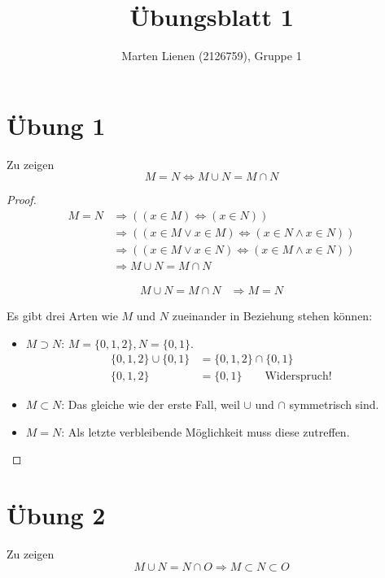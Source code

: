 \documentclass[a4paper,10pt]{article}
\title{Übungsblatt 1}
\author{Marten Lienen (2126759), Gruppe 1}
\begin{document}
\maketitle

\section*{Übung 1}

Zu zeigen
\begin{equation}
 M = N \Leftrightarrow M \cup N = M \cap N
\end{equation}

\begin{proof}
 \begin{align}
  M = N & \Rightarrow ((x \in M) \Leftrightarrow (x \in N))\\
  & \Rightarrow ((x \in M \lor x \in M) \Leftrightarrow (x \in N \land x \in N))\\
  & \Rightarrow ((x \in M \lor x \in N) \Leftrightarrow (x \in M \land x \in N))\\
  & \Rightarrow M \cup N = M \cap N
 \end{align}
 
 \begin{align}
  M \cup N = M \cap N & \Rightarrow M = N
 \end{align}
 
 Es gibt drei Arten wie $M$ und $N$ zueinander in Beziehung stehen können:
 \begin{itemize}
  \item $M \supset N$: $M = \{0, 1, 2\}, N = \{0, 1\}$.
   \begin{align}
    \{0, 1, 2\} \cup \{0, 1\} & = \{0, 1, 2\} \cap \{0, 1\}\\
    \{0, 1, 2\} & = \{0, 1\} \qquad \text{Widerspruch!}
   \end{align}
  \item $M \subset N$: Das gleiche wie der erste Fall, weil $\cup$ und $\cap$ symmetrisch sind.
  \item $M = N$: Als letzte verbleibende Möglichkeit muss diese zutreffen.
 \end{itemize}
\end{proof}

\section*{Übung 2}

Zu zeigen
\begin{equation}
 M \cup N = N \cap O \Rightarrow M \subset N \subset O
\end{equation}
\end{document}
